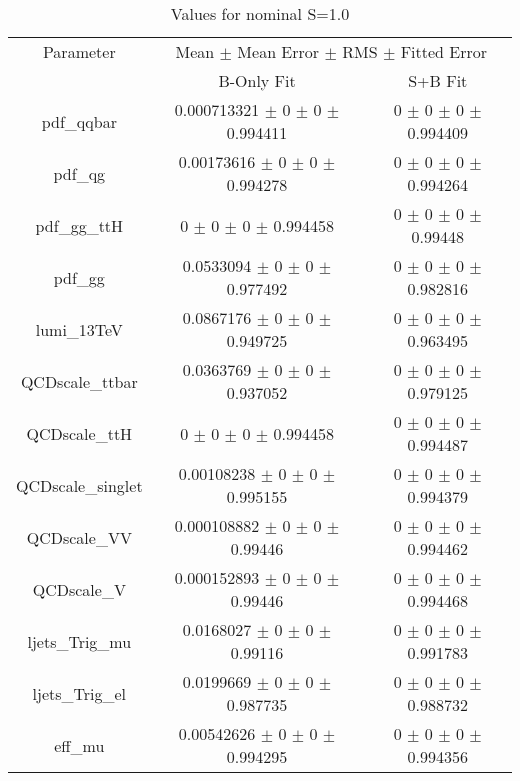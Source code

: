 \begin{table}
\centering
\caption{Values for nominal S=1.0}
\begin{tabular}{ccc}
\toprule
Parameter & \multicolumn{2}{c}{Mean $\pm$ Mean Error $\pm$ RMS $\pm$ Fitted Error}\\
 & B-Only Fit & S+B Fit\\
\midrule
pdf\_qqbar & \num{0.000713321} $\pm$ \num{0} $\pm$ \num{0} $\pm$ \num{0.994411} & \num{0} $\pm$ \num{0} $\pm$ \num{0} $\pm$ \num{0.994409}\\
pdf\_qg & \num{0.00173616} $\pm$ \num{0} $\pm$ \num{0} $\pm$ \num{0.994278} & \num{0} $\pm$ \num{0} $\pm$ \num{0} $\pm$ \num{0.994264}\\
pdf\_gg\_ttH & \num{0} $\pm$ \num{0} $\pm$ \num{0} $\pm$ \num{0.994458} & \num{0} $\pm$ \num{0} $\pm$ \num{0} $\pm$ \num{0.99448}\\
pdf\_gg & \num{0.0533094} $\pm$ \num{0} $\pm$ \num{0} $\pm$ \num{0.977492} & \num{0} $\pm$ \num{0} $\pm$ \num{0} $\pm$ \num{0.982816}\\
lumi\_13TeV & \num{0.0867176} $\pm$ \num{0} $\pm$ \num{0} $\pm$ \num{0.949725} & \num{0} $\pm$ \num{0} $\pm$ \num{0} $\pm$ \num{0.963495}\\
QCDscale\_ttbar & \num{0.0363769} $\pm$ \num{0} $\pm$ \num{0} $\pm$ \num{0.937052} & \num{0} $\pm$ \num{0} $\pm$ \num{0} $\pm$ \num{0.979125}\\
QCDscale\_ttH & \num{0} $\pm$ \num{0} $\pm$ \num{0} $\pm$ \num{0.994458} & \num{0} $\pm$ \num{0} $\pm$ \num{0} $\pm$ \num{0.994487}\\
QCDscale\_singlet & \num{0.00108238} $\pm$ \num{0} $\pm$ \num{0} $\pm$ \num{0.995155} & \num{0} $\pm$ \num{0} $\pm$ \num{0} $\pm$ \num{0.994379}\\
QCDscale\_VV & \num{0.000108882} $\pm$ \num{0} $\pm$ \num{0} $\pm$ \num{0.99446} & \num{0} $\pm$ \num{0} $\pm$ \num{0} $\pm$ \num{0.994462}\\
QCDscale\_V & \num{0.000152893} $\pm$ \num{0} $\pm$ \num{0} $\pm$ \num{0.99446} & \num{0} $\pm$ \num{0} $\pm$ \num{0} $\pm$ \num{0.994468}\\
ljets\_Trig\_mu & \num{0.0168027} $\pm$ \num{0} $\pm$ \num{0} $\pm$ \num{0.99116} & \num{0} $\pm$ \num{0} $\pm$ \num{0} $\pm$ \num{0.991783}\\
ljets\_Trig\_el & \num{0.0199669} $\pm$ \num{0} $\pm$ \num{0} $\pm$ \num{0.987735} & \num{0} $\pm$ \num{0} $\pm$ \num{0} $\pm$ \num{0.988732}\\
eff\_mu & \num{0.00542626} $\pm$ \num{0} $\pm$ \num{0} $\pm$ \num{0.994295} & \num{0} $\pm$ \num{0} $\pm$ \num{0} $\pm$ \num{0.994356}\\

\end{tabular}
\end{table}
